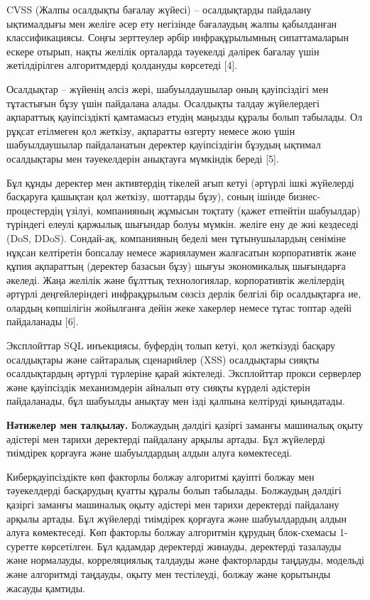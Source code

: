 \documentclass[
]{article}
\begin{document}
CVSS (Жалпы осалдықты бағалау жүйесі) -- осалдықтарды пайдалану
ықтималдығы мен желіге әсер ету негізінде бағалаудың жалпы қабылданған
классификациясы. Соңғы зерттеулер әрбір инфрақұрылымның сипаттамаларын
ескере отырып, нақты желілік орталарда тәуекелді дәлірек бағалау үшін
жетілдірілген алгоритмдерді қолдануды көрсетеді {[}4{]}.

Осалдықтар -- жүйенің әлсіз жері, шабуылдаушылар оның қауіпсіздігі мен
тұтастығын бұзу үшін пайдалана алады. Осалдықты талдау жүйелердегі
ақпараттық қауіпсіздікті қамтамасыз етудің маңызды құралы болып
табылады. Ол рұқсат етілмеген қол жеткізу, ақпаратты өзгерту немесе жою
үшін шабуылдаушылар пайдаланатын деректер қауіпсіздігін бұзудың ықтимал
осалдықтары мен тәуекелдерін анықтауға мүмкіндік береді {[}5{]}.

Бұл құнды деректер мен активтердің тікелей ағып кетуі (әртүрлі ішкі
жүйелерді басқаруға қашықтан қол жеткізу, шоттарды бұзу), соның ішінде
бизнес-процестердің үзілуі, компанияның жұмысын тоқтату (қажет етпейтін
шабуылдар) түріндегі елеулі қаржылық шығындар болуы мүмкін. желіге ену
де жиі кездеседі (DoS, DDoS). Сондай-ақ, компанияның беделі мен
тұтынушылардың сеніміне нұқсан келтіретін бопсалау немесе жариялаумен
жалғасатын корпоративтік және құпия ақпараттың (деректер базасын бұзу)
шығуы экономикалық шығындарға әкеледі. Жаңа желілік және бұлттық
технологиялар, корпоративтік желілердің әртүрлі деңгейлеріндегі
инфрақұрылым сөзсіз дерлік белгілі бір осалдықтарға ие, олардың
көпшілігін жойылғанға дейін жеке хакерлер немесе тұтас топтар әдейі
пайдаланады {[}6{]}.

Эксплойттар SQL инъекциясы, буфердің толып кетуі, қол жеткізуді басқару
осалдықтары және сайтаралық сценарийлер (XSS) осалдықтары сияқты
осалдықтардың әртүрлі түрлеріне қарай жіктеледі. Эксплойттар прокси
серверлер және қауіпсіздік механизмдерін айналып өту сияқты күрделі
әдістерін пайдаланады, бұл шабуылды анықтау мен ізді қалпына келтіруді
қиындатады.

\textbf{Нәтижелер мен талқылау.} Болжаудың дәлдігі қазіргі заманғы
машиналық оқыту әдістері мен тарихи деректерді пайдалану арқылы артады.
Бұл жүйелерді тиімдірек қорғауға және шабуылдардың алдын алуға
көмектеседі.

Киберқауіпсіздікте көп факторлы болжау алгоритмі қауіпті болжау мен
тәуекелдерді басқарудың қуатты құралы болып табылады. Болжаудың дәлдігі
қазіргі заманғы машиналық оқыту әдістері мен тарихи деректерді пайдалану
арқылы артады. Бұл жүйелерді тиімдірек қорғауға және шабуылдардың алдын
алуға көмектеседі. Көп факторлы болжау алгоритмін құрудың блок-схемасы
1-суретте көрсетілген. Бұл қадамдар деректерді жинауды, деректерді
тазалауды және нормалауды, корреляциялық талдауды және факторларды
таңдауды, модельді және алгоритмді таңдауды, оқыту мен тестілеуді,
болжау және қорытынды жасауды қамтиды.
\end{document}
